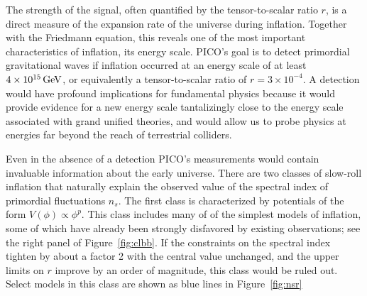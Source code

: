 \documentclass[PICOReport.tex]{subfiles}
\begin{document}
The strength of the signal, often quantified by the tensor-to-scalar ratio $r$, is a direct measure of the expansion rate of the universe during inflation. Together with the Friedmann equation, this reveals one of the most important characteristics of inflation, its energy scale. PICO's goal is to detect primordial gravitational waves if inflation occurred at an energy scale of at least $4\times 10^{15}\,\rm{GeV}$, or equivalently a tensor-to-scalar ratio of $r=3\times 10^{-4}$. 
A detection would have profound implications for fundamental physics because it would provide evidence for a new energy scale tantalizingly close to the energy scale associated with grand unified theories, and would allow us to probe physics at energies far beyond the reach of terrestrial colliders.

Even in the absence of a detection PICO's measurements would contain invaluable information about the early universe. There are two classes of slow-roll inflation that naturally explain the observed value of the spectral index of primordial fluctuations $n_s$. The first class is characterized by potentials of the form $V(\phi)\propto\phi^p$. This class includes many of of the simplest models of inflation, some of which have already been strongly disfavored by existing observations; see the right panel of Figure~\ref{fig:clbb}. If the constraints on the spectral index tighten by about a factor 2 with the central value unchanged, and the upper limits on $r$ improve by an order of magnitude, this class 
would be ruled out. Select models in this class are shown as blue lines in Figure~\ref{fig:nsr}
\end{document}
